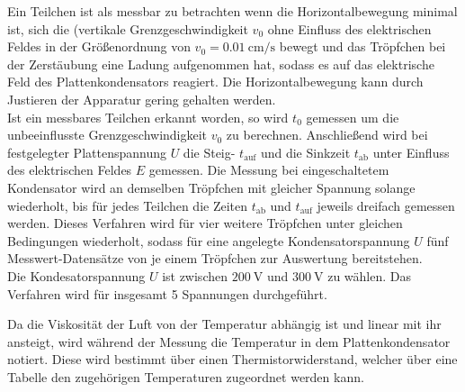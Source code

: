 Ein Teilchen ist als messbar zu betrachten wenn die Horizontalbewegung minimal ist, 
sich die (vertikale Grenzgeschwindigkeit $v_0$ ohne Einfluss des elektrischen Feldes in der Größenordnung von $v_0=\SI{0.01}{\centi\meter\per\second}$ bewegt und 
das Tröpfchen bei der Zerstäubung eine Ladung aufgenommen hat, sodass es auf das elektrische Feld des Plattenkondensators reagiert. Die Horizontalbewegung kann durch Justieren der Apparatur gering gehalten werden.\\
Ist ein messbares Teilchen erkannt worden, so wird $t_0$ gemessen um die unbeeinflusste Grenzgeschwindigkeit $v_0$ zu berechnen. 
Anschließend wird bei festgelegter Plattenspannung $U$ die Steig- $t_\text{auf}$ und die Sinkzeit $t_\text{ab}$ unter Einfluss des elektrischen Feldes $E$ gemessen.
Die Messung bei eingeschaltetem Kondensator wird an demselben Tröpfchen mit gleicher Spannung solange wiederholt, bis für jedes Teilchen die Zeiten $t_\text{ab}$ und $t_\text{auf}$ jeweils dreifach gemessen werden.
Dieses Verfahren wird für vier weitere Tröpfchen unter gleichen Bedingungen wiederholt, sodass für eine angelegte Kondensatorspannung $U$ fünf Messwert-Datensätze von je einem Tröpfchen zur Auswertung bereitstehen.\\
Die Kondesatorspannung $U$ ist zwischen $\SI{200}{\volt}$ und $\SI{300}{\volt}$ zu wählen.
Das Verfahren wird für insgesamt 5 Spannungen durchgeführt.

Da die Viskosität der Luft von der Temperatur abhängig ist und linear mit ihr ansteigt,
wird während der Messung  die Temperatur in dem Plattenkondensator notiert. Diese wird bestimmt über einen Thermistorwiderstand, welcher über eine Tabelle den zugehörigen Temperaturen zugeordnet werden kann.


